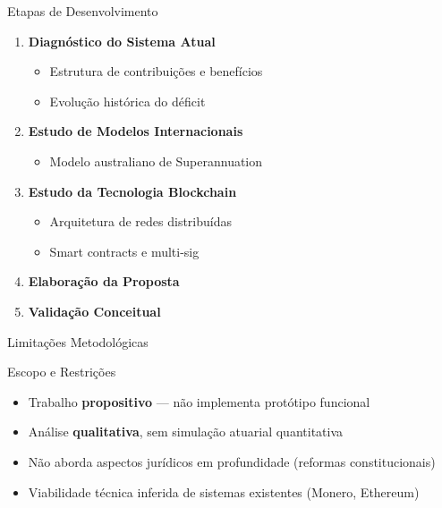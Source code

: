 \documentclass{libs/ufc_format}
\begin{document}
\begin{frame}{Etapas de Desenvolvimento}
    \begin{enumerate}
        \item \textbf{Diagnóstico do Sistema Atual}
        \begin{itemize}
            \item Estrutura de contribuições e benefícios
            \item Evolução histórica do déficit
        \end{itemize}
        
        \item \textbf{Estudo de Modelos Internacionais}
        \begin{itemize}
            \item Modelo australiano de Superannuation
        \end{itemize}
        
        \item \textbf{Estudo da Tecnologia Blockchain}
        \begin{itemize}
            \item Arquitetura de redes distribuídas
            \item Smart contracts e multi-sig
        \end{itemize}
        
        \item \textbf{Elaboração da Proposta}
        
        \item \textbf{Validação Conceitual}
    \end{enumerate}
\end{frame}

\begin{frame}{Limitações Metodológicas}
    \begin{alertblock}{Escopo e Restrições}
        \begin{itemize}
            \item Trabalho \textbf{propositivo} --- não implementa protótipo funcional
            \item Análise \textbf{qualitativa}, sem simulação atuarial quantitativa
            \item Não aborda aspectos jurídicos em profundidade (reformas constitucionais)
            \item Viabilidade técnica inferida de sistemas existentes (Monero, Ethereum)
        \end{itemize}
    \end{alertblock}

    \vspace{0.3cm}

\end{frame}
\end{document}
